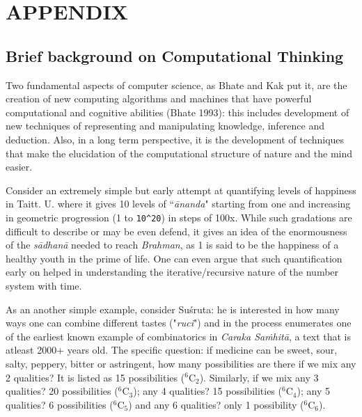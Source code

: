 {\appendix
\section{APPENDIX}\label{chap3-app1}


\subsection*{Brief background on Computational Thinking}

Two fundamental aspects of computer science, as Bhate and Kak put it, are the creation of new computing algorithms and machines that have powerful computational and cognitive abilities (Bhate 1993): this includes development of new techniques of representing and manipulating knowledge, inference and deduction. Also, in a long term perspective, it is the development of techniques that make the elucidation of the computational structure of nature and the mind easier.

Consider an extremely simple but early attempt at quantifying levels of happiness in Taitt. U. where it gives 10 levels of “\textsl{ānanda}" starting from one and increasing in geometric progression (1 to \verb|10^20|) in steps of 100x. While such gradations are difficult to describe or may be even defend, it gives an idea of the enormousness of the \textsl{sādhanā} needed to reach \textsl{Brahman}, as 1 is said to be the happiness of a healthy youth in the prime of life. One can even argue that such quantification early on helped in understanding the iterative/recursive nature of the number system with time.

As an another simple example, consider Suśruta: he is interested in how many ways one can combine different tastes ("\textsl{ruci}") and in the process enumerates one of the earliest known example of combinatorics in \textsl{Caraka Saṁhitā}, a text that is atleast 2000+ years old. The specific question: if medicine can be sweet, sour, salty, peppery, bitter or astringent, how many possibilities are there if we mix any 2 qualities? It is listed as 15 possibilities ($^{6}$C$_{2}$). Similarly, if we mix any 3 qualities? 20 possibilities ($^{6}$C$_{3}$); any 4 qualities? 15 possibilities ($^{6}$C$_{4}$); any 5 qualities? 6 possibilities ($^{6}$C$_{5}$) and any 6 qualities? only 1 possibility ($^{6}$C$_{6}$).

}
